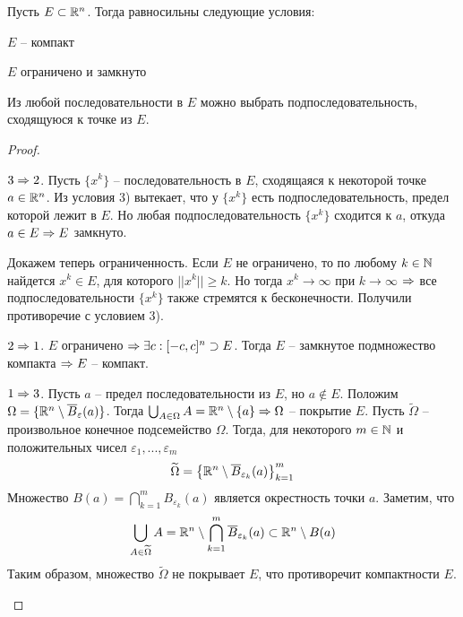     \begin{Thm}
        Пусть $E \subset \mathbb{R}^n$. Тогда равносильны следующие условия:
        \begin{MyList}
            \item $E$ -- компакт
            \item $E$ ограничено и замкнуто
            \item Из любой последовательности в $E$ можно выбрать подпоследовательность, сходящуюся к точке из $E$.
        \end{MyList}
    \end{Thm}

    \begin{proof}
        \begin{MyList}
            \item[] $3 \Rightarrow 2$. Пусть $\{x^k\}$ -- последовательность в $E$, сходящаяся к некоторой точке $a \in \mathbb{R}^n$. 
            Из условия 3) вытекает, что у $\{x^k\}$ есть подпоследовательность, предел которой лежит в $E$. Но любая подпоследовательность $\{x^k\}$ сходится к $a$, откуда $a \in E \Rightarrow E$ замкнуто.

            Докажем теперь ограниченность. Если $E$ не ограничено, то по любому $k \in \mathbb{N}$ найдется $x^k \in E$, для которого $||x^k|| \geqslant k$. 
            Но тогда $x^k \to \infty$ при $k \to \infty$ $\Rightarrow$ все подпоследовательности $\{x^k\}$ также стремятся к бесконечности. Получили противоречие с условием 3). 

            \item[] $2 \Rightarrow 1$. $E$ ограничено $\Rightarrow \exists c : [-c, c]^n \supset E$. Тогда $E$ -- замкнутое подмножество компакта $\Rightarrow E$ -- компакт.
            \item[] $1 \Rightarrow 3$. Пусть $a$ -- предел последовательности из $E$, но $a \notin E$. Положим $\Omega = \{\mathbb{R}^n \setminus \overline{B}_\varepsilon(a)\}$.
            Тогда $\bigcup_{A \in \Omega} A = \mathbb{R}^n \setminus \{a\} \Rightarrow \Omega$ -- покрытие $E$. 
            Пусть $\widetilde{\Omega}$ -- произвольное конечное подсемейство $\Omega$. Тогда, для некоторого $m \in \mathbb{N}$ и положительных чисел
            $\varepsilon_1, ..., \varepsilon_m$
            \[\widetilde{\Omega} = \left\{\mathbb{R}^n \setminus \overline{B}_{\varepsilon_k}(a)\right\}_{k = 1}^m\]   
            Множество $B(a) = \displaystyle{\bigcap_{k = 1}^m}B_{\varepsilon_k}(a)$ является окрестность точки $a$. Заметим, что
            \[\bigcup_{A \in \widetilde{\Omega}}A = \mathbb{R}^n \setminus \bigcap_{k = 1}^m \overline{B}_{\varepsilon_k}(a) \subset \mathbb{R}^n \setminus B(a)\]
            Таким образом, множество $\widetilde{\Omega}$ не покрывает $E$, что противоречит компактности $E$. 
        \end{MyList}
    \end{proof}


